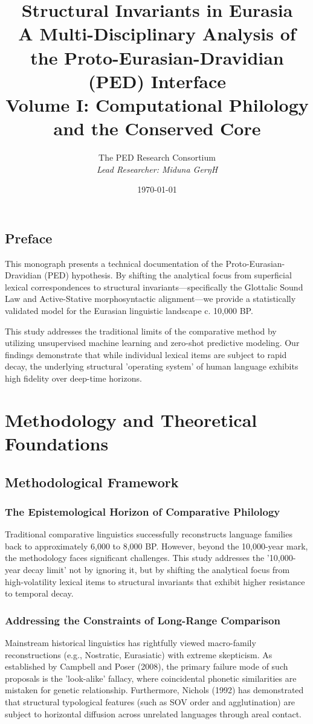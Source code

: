 \documentclass[11pt,oneside,openany]{book}
\title{\Huge \textbf{Structural Invariants in Eurasia} \\ \vspace{1cm} \Large A Multi-Disciplinary Analysis of the Proto-Eurasian-Dravidian (PED) Interface \\ \vspace{0.5cm} \large Volume I: Computational Philology and the Conserved Core}
\author{The PED Research Consortium \\ \textit{Lead Researcher: Miduna GerŋH}}
\date{\today}
\begin{document}
\maketitle

\chapter*{Preface}
This monograph presents a technical documentation of the Proto-Eurasian-Dravidian (PED) hypothesis. By shifting the analytical focus from superficial lexical correspondences to structural invariants—specifically the Glottalic Sound Law and Active-Stative morphosyntactic alignment—we provide a statistically validated model for the Eurasian linguistic landscape c. 10,000 BP. 

This study addresses the traditional limits of the comparative method by utilizing unsupervised machine learning and zero-shot predictive modeling. Our findings demonstrate that while individual lexical items are subject to rapid decay, the underlying structural 'operating system' of human language exhibits high fidelity over deep-time horizons.

\tableofcontents

\part{Methodology and Theoretical Foundations}
\chapter{Methodological Framework}

\section{The Epistemological Horizon of Comparative Philology}
Traditional comparative linguistics successfully reconstructs language families back to approximately 6,000 to 8,000 BP. However, beyond the 10,000-year mark, the methodology faces significant challenges. This study addresses the '10,000-year decay limit' not by ignoring it, but by shifting the analytical focus from high-volatility lexical items to structural invariants that exhibit higher resistance to temporal decay.

\section{Addressing the Constraints of Long-Range Comparison}
Mainstream historical linguistics has rightfully viewed macro-family reconstructions (e.g., Nostratic, Eurasiatic) with extreme skepticism. As established by Campbell and Poser (2008), the primary failure mode of such proposals is the 'look-alike' fallacy, where coincidental phonetic similarities are mistaken for genetic relationship. Furthermore, Nichols (1992) has demonstrated that structural typological features (such as SOV order and agglutination) are subject to horizontal diffusion across unrelated languages through areal contact.
\end{document}
